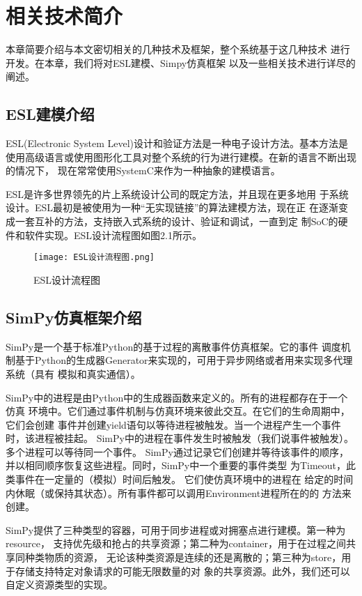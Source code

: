 
\chapter{相关技术简介}
本章简要介绍与本文密切相关的几种技术及框架，整个系统基于这几种技术
进行开发。在本章，我们将对ESL建模、Simpy仿真框架
以及一些相关技术进行详尽的阐述。

\section{ESL建模介绍}
ESL(Electronic System Level)设计和验证方法是一种电子设计方法。基本方法是
使用高级语言或使用图形化工具对整个系统的行为进行建模。在新的语言不断出现的情况下，
现在常常使用SystemC来作为一种抽象的建模语言。

ESL是许多世界领先的片上系统设计公司的既定方法，并且现在更多地用
于系统设计。ESL最初是被使用为一种“无实现链接”的算法建模方法，现在正
在逐渐变成一套互补的方法，支持嵌入式系统的设计、验证和调试，一直到定
制SoC的硬件和软件实现\cite{41}。ESL设计流程图\cite{42}如图2.1所示。

\begin{figure}
  \centering
  \texttt{[image: ESL设计流程图.png]}
  \caption{ESL设计流程图}
  \label{fig:badge}
\end{figure}

\section{SimPy仿真框架介绍}
SimPy是一个基于标准Python的基于过程的离散事件仿真框架。它的事件
调度机制基于Python的生成器Generator来实现的，可用于异步网络或者用来实现多代理系统（具有
模拟和真实通信）。

SimPy中的进程是由Python中的生成器函数来定义的。所有的进程都存在于一个仿真
环境中。它们通过事件机制与仿真环境来彼此交互。在它们的生命周期中，它们会创建
事件并创建yield语句以等待进程被触发。当一个进程产生一个事件时，该进程被挂起。
SimPy中的进程在事件发生时被触发（我们说事件被触发）。多个进程可以等待同一个事件。
SimPy通过记录它们创建并等待该事件的顺序，并以相同顺序恢复这些进程。同时，SimPy中一个重要的事件类型
为Timeout，此类事件在一定量的（模拟）时间后触发。 它们使仿真环境中的进程在
给定的时间内休眠（或保持其状态）。所有事件都可以调用Environment进程所在的的
方法来创建。

SimPy提供了三种类型的容器，可用于同步进程或对拥塞点进行建模。第一种为resource，
支持优先级和抢占的共享资源；第二种为container，用于在过程之间共享同种类物质的资源，
无论该种类资源是连续的还是离散的；第三种为store，用于存储支持特定对象请求的可能无限数量的对
象的共享资源。此外，我们还可以自定义资源类型的实现。

